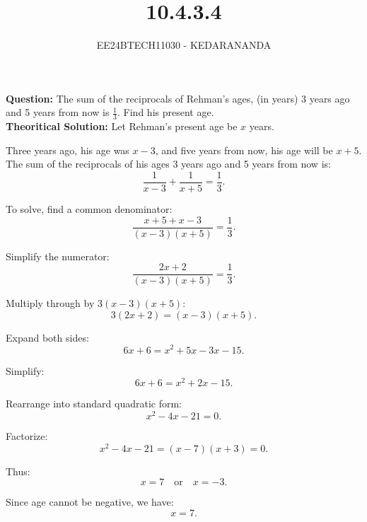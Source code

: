 \documentclass[journal]{IEEEtran}
\begin{document}
	
	
	\vspace{3cm}
	
	\title{10.4.3.4}
	\author{EE24BTECH11030 - KEDARANANDA}
	{\let\newpage\relax\maketitle}
	
	\renewcommand{\thefigure}{\theenumi}
	\renewcommand{\thetable}{\theenumi}
	\setlength{\intextsep}{10pt} %
	
	\textbf{Question:}
	\newline
	The sum of the reciprocals of Rehman's ages, (in years) 3 years ago and 5 years from
	now is $\frac{1}{3}.$ Find his present age.\\
	\textbf{Theoritical Solution:}
	Let Rehman's present age be $x$ years. 
	
	Three years ago, his age was $x-3$, and five years from now, his age will be $x+5$. 
	The sum of the reciprocals of his ages 3 years ago and 5 years from now is:
	\[
	\frac{1}{x-3} + \frac{1}{x+5} = \frac{1}{3}.
	\]
	
	To solve, find a common denominator:
	\[
	\frac{x+5 + x-3}{(x-3)(x+5)} = \frac{1}{3}.
	\]
	
	Simplify the numerator:
	\[
	\frac{2x + 2}{(x-3)(x+5)} = \frac{1}{3}.
	\]
	
	Multiply through by $3(x-3)(x+5)$:
	\[
	3(2x + 2) = (x-3)(x+5).
	\]
	
	Expand both sides:
	\[
	6x + 6 = x^2 + 5x - 3x - 15.
	\]
	
	Simplify:
	\[
	6x + 6 = x^2 + 2x - 15.
	\]
	
	Rearrange into standard quadratic form:
	\[
	x^2 - 4x - 21 = 0.
	\]
	
	Factorize:
	\[
	x^2 - 4x - 21 = (x - 7)(x + 3) = 0.
	\]
	
	Thus:
	\[
	x = 7 \quad \text{or} \quad x = -3.
	\]
	
	Since age cannot be negative, we have:
	\[
	x = 7.
	\]
	
\end{document}
